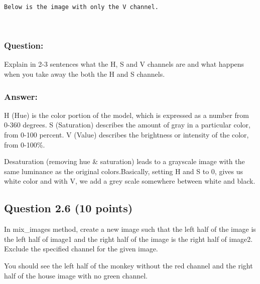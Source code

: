 \documentclass[11pt]{article}
\begin{document}
    \begin{Verbatim}[commandchars=\\\{\}]
Below is the image with only the V channel.

    \end{Verbatim}

    \begin{center}
    \end{center}
    { \hspace*{\fill} \\}
    
    \subsubsection{Question:}\label{question}

Explain in 2-3 sentences what the H, S and V channels are and what
happens when you take away the both the H and S channels.

\subsubsection{Answer:}\label{answer}

H (Hue) is the color portion of the model, which is expressed as a
number from 0-360 degrees. S (Saturation) describes the amount of gray
in a particular color, from 0-100 percent. V (Value) describes the
brightness or intensity of the color, from 0-100\%.

Desaturation (removing hue \& saturation) leads to a grayscale image
with the same luminance as the original colors.Basically, setting H and
S to 0, gives us white color and with V, we add a grey scale somewhere
between white and black.

    \subsection{Question 2.6 (10 points)}\label{question-2.6-10-points}

In mix\_images method, create a new image such that the left half of the
image is the left half of image1 and the right half of the image is the
right half of image2. Exclude the specified channel for the given image.

You should see the left half of the monkey without the red channel and
the right half of the house image with no green channel.
\end{document}
